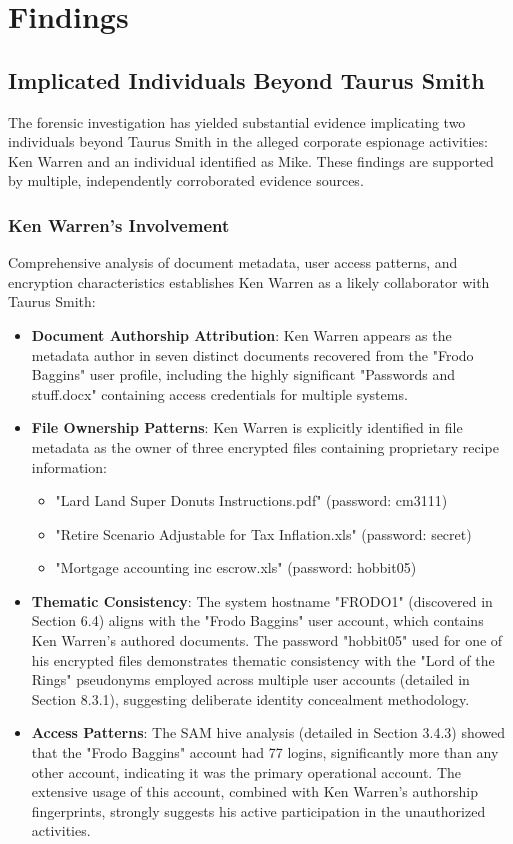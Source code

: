 \chapter{Findings}

\section{Implicated Individuals Beyond Taurus Smith}
The forensic investigation has yielded substantial evidence implicating two individuals beyond Taurus Smith in the alleged corporate espionage activities: Ken Warren and an individual identified as Mike. These findings are supported by multiple, independently corroborated evidence sources.

\subsection{Ken Warren's Involvement}
Comprehensive analysis of document metadata, user access patterns, and encryption characteristics establishes Ken Warren as a likely collaborator with Taurus Smith:

\begin{itemize}
    \item \textbf{Document Authorship Attribution}: Ken Warren appears as the metadata author in seven distinct documents recovered from the "Frodo Baggins" user profile, including the highly significant "Passwords and stuff.docx" containing access credentials for multiple systems.
    
    \item \textbf{File Ownership Patterns}: Ken Warren is explicitly identified in file metadata as the owner of three encrypted files containing proprietary recipe information:
    \begin{itemize}
        \item "Lard Land Super Donuts Instructions.pdf" (password: cm3111)
        \item "Retire Scenario Adjustable for Tax Inflation.xls" (password: secret)
        \item "Mortgage accounting inc escrow.xls" (password: hobbit05)
    \end{itemize}
    
    \item \textbf{Thematic Consistency}: The system hostname "FRODO1" (discovered in Section 6.4) aligns with the "Frodo Baggins" user account, which contains Ken Warren's authored documents. The password "hobbit05" used for one of his encrypted files demonstrates thematic consistency with the "Lord of the Rings" pseudonyms employed across multiple user accounts (detailed in Section 8.3.1), suggesting deliberate identity concealment methodology.
    
    \item \textbf{Access Patterns}: The SAM hive analysis (detailed in Section 3.4.3) showed that the "Frodo Baggins" account had 77 logins, significantly more than any other account, indicating it was the primary operational account. The extensive usage of this account, combined with Ken Warren's authorship fingerprints, strongly suggests his active participation in the unauthorized activities.
\end{itemize}


